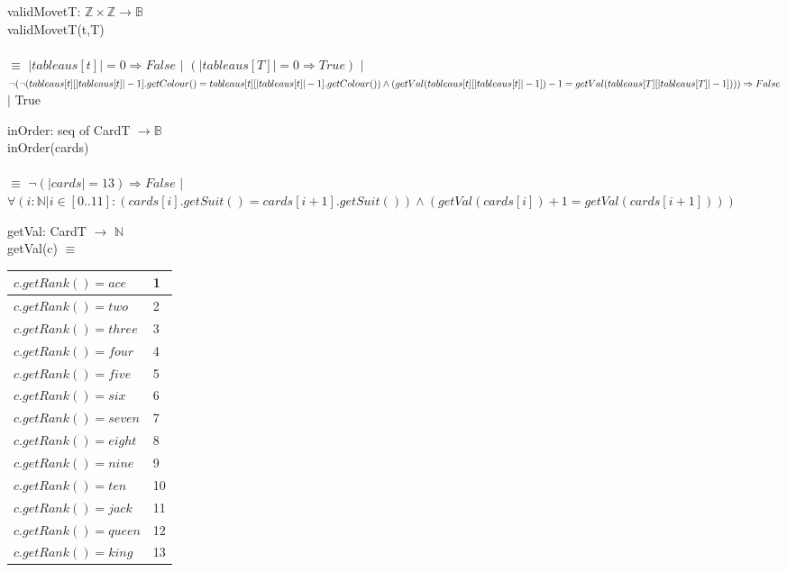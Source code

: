 \documentclass[12pt]{article}
\begin{document}
\medskip
\medskip

\noindent validMovetT: $\mathbb{Z} \times \mathbb{Z} \rightarrow \mathbb{B}$ \\
\noindent validMovetT(t,T) \\ \\
$\equiv$ $|tableaus[t]| = 0 \Rightarrow False$ $|$  $(|tableaus[T]| = 0 \Rightarrow True)$ $|$ \\ $\neg(\neg(tableaus[t][|tableaus[t]|-1].getColour() = tableaus[t][|tableaus[t]| -1].getColour()) \wedge \\ (getVal(tableaus[t][|tableaus[t]|-1]) - 1 = getVal(tableaus[T][|tableaus[T]| -1]))) \Rightarrow False$ $|$ True \\

\medskip
\medskip

\noindent inOrder: seq of CardT $\rightarrow \mathbb{B}$ \\
\noindent inOrder(cards) \\ \\
$\equiv$ $\neg(|cards| = 13) \Rightarrow False$ $|$  $\forall(i : \mathbb{N} | i \in [0..11] : (cards[i].getSuit() = cards[i+1].getSuit()) \wedge (getVal(cards[i]) + 1 = getVal(cards[i+1])))$\\

\medskip
\medskip

\noindent getVal: CardT $\rightarrow$ $\mathbb{N}$ \\
\noindent getVal(c) $\equiv$ \\

\medskip

\begin{tabular}{|l|l|}
\hline
$c.getRank() = ace$ & 1\\
\hline
$c.getRank() = two$ & 2\\
\hline
$c.getRank() = three$ & 3\\
\hline
$c.getRank() = four$ & 4\\
\hline
$c.getRank() = five$ & 5\\
\hline
$c.getRank() = six$ & 6\\
\hline
$c.getRank() = seven$ & 7\\
\hline
$c.getRank() = eight$ & 8\\
\hline
$c.getRank() = nine$ & 9\\
\hline
$c.getRank() = ten$ & 10\\
\hline
$c.getRank() = jack$ & 11\\
\hline
$c.getRank() = queen$ & 12\\
\hline
$c.getRank() = king$ & 13\\
\hline
\end{tabular}
\end{document}
